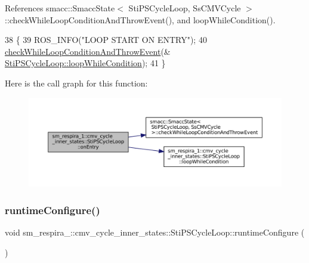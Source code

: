 References smacc\+::\+Smacc\+State$<$ Sti\+P\+S\+Cycle\+Loop, Ss\+C\+M\+V\+Cycle $>$\+::check\+While\+Loop\+Condition\+And\+Throw\+Event(), and loop\+While\+Condition().


\begin{DoxyCode}
38   \{
39     ROS\_INFO(\textcolor{stringliteral}{"LOOP START ON ENTRY"});
40     \hyperlink{classsmacc_1_1SmaccState_a80082718f226bebedb589f0c4696001d}{checkWhileLoopConditionAndThrowEvent}(&
      \hyperlink{structsm__respira__1_1_1cmv__cycle__inner__states_1_1StiPSCycleLoop_a0dbaf83715bbaca237b49d7739b7a993}{StiPSCycleLoop::loopWhileCondition});
41   \}
\end{DoxyCode}
Here is the call graph for this function\+:
\nopagebreak
\begin{figure}[H]
\begin{center}
\leavevmode
\includegraphics[width=350pt]{structsm__respira__1_1_1cmv__cycle__inner__states_1_1StiPSCycleLoop_aecd37369448382fa73cf481f58acc9fc_cgraph}
\end{center}
\end{figure}
\mbox{\label{structsm__respira__1_1_1cmv__cycle__inner__states_1_1StiPSCycleLoop_a0f5907ad97cc0722381330acaa7f78f5}} 
\subsubsection{\texorpdfstring{runtime\+Configure()}{runtimeConfigure()}}
{\footnotesize\ttfamily void sm\+\_\+respira\+\_\+::cmv\+\_\+cycle\+\_\+inner\+\_\+states\+::\+Sti\+P\+S\+Cycle\+Loop\+::runtime\+Configure (\begin{DoxyParamCaption}{ }\end{DoxyParamCaption})\hspace{0.3cm}{\ttfamily [inline]}}



